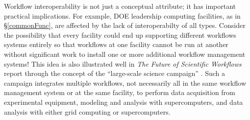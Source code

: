 Workflow interoperability is not just a conceptual attribute; it has
important practical implications. For example, DOE leadership computing
facilities, as in \S\ref{commonFunc}, are affected by the lack of
interoperabilty of all types. Consider the possibility that every facility
could end up supporting different workflows systems entirely so that workflows
at one facility cannot be run at another without significant work to install
one or more additional workflow management systems! This idea is also
illustrated well in \textit{The Future of Scientific Workflows} report through
the concept of the ``large-scale science campaign'' \cite{deelman_future_2015}.
Such a campaign integrates multiple workflows, not necessarily all in the same
workflow management system or at the same facility, to perform data
acquisition from experimental equipment, modeling and analysis with
supercomputers, and data analysis with either grid computing or
supercomputers.